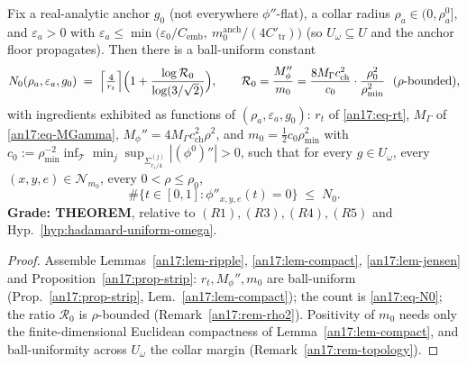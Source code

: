 \begin{theorem}\label{an17:thm-N0}%
\label{an17:lem-N0an}%
\label{an17:N0-analytic}%
\label{lem:an-N0analytic}%
Fix a real-analytic anchor $g_0$ (not everywhere $\phi''$-flat), a collar radius
$\rho_a\in(0,\rho_a^0]$, and $\varepsilon_a>0$ with $\varepsilon_a\le\min\bigl(
\varepsilon_0/C_{\mathrm{emb}},\ m_0^{\mathrm{anch}}/(4C'_{\mathrm{tr}})\bigr)$
(so $U_\omega\subseteq U$ and the anchor floor propagates). Then there is a
ball-uniform constant
\begin{equation}\label{an17:eq-N0final}
 N_0(\rho_a,\varepsilon_a,g_0)\;=\;\Bigl\lceil\tfrac4{r_t}\Bigr\rceil\Bigl(1+
 \frac{\log\mathcal R_0}{\log(3/\sqrt2)}\Bigr),\qquad
 \mathcal R_0=\frac{M_\phi''}{m_0}=\frac{8M_\Gamma c_{\mathrm{ch}}^2}{c_0}\cdot
 \frac{\rho_0^2}{\rho_{\min}^2}\ \ (\rho\text{-bounded}),
\end{equation}
with ingredients exhibited as functions of $(\rho_a,\varepsilon_a,g_0)$: $r_t$ of
\eqref{an17:eq-rt}, $M_\Gamma$ of \eqref{an17:eq-MGamma}, $M_\phi''=4M_\Gamma
c_{\mathrm{ch}}^2\rho^2$, and $m_0=\tfrac12 c_0\rho_{\min}^2$ with $c_0:=
\rho_{\min}^{-2}\inf_{\mathcal T}\min_j\sup_{\Sigma_{r_t/4}^{(j)}}|(\phi^0)''|>0$,
such that for every $g\in U_\omega$, every $(x,y,e)\in\mathcal N_{m_0}$, every
$0<\rho\le\rho_0$,
\[
 \#\{t\in[0,1]:\phi''_{x,y,e}(t)=0\}\;\le\;N_0 .
\]
\textbf{Grade: THEOREM}, relative to $(R1),(R3),(R4),(R5)$ and
Hyp.~\ref{hyp:hadamard-uniform-omega}.
\end{theorem}
\begin{proof}
Assemble Lemmas~\ref{an17:lem-ripple}, \ref{an17:lem-compact},
\ref{an17:lem-jensen} and Proposition~\ref{an17:prop-strip}: $r_t,M_\phi'',m_0$
are ball-uniform (Prop.~\ref{an17:prop-strip}, Lem.~\ref{an17:lem-compact}); the
count is \eqref{an17:eq-N0}; the ratio $\mathcal R_0$ is $\rho$-bounded
(Remark~\ref{an17:rem-rho2}). Positivity of $m_0$ needs only the finite-dimensional
Euclidean compactness of Lemma~\ref{an17:lem-compact}, and ball-uniformity across
$U_\omega$ the collar margin (Remark~\ref{an17:rem-topology}).
\end{proof}

